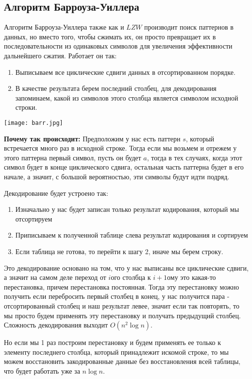 \documentclass{article}
\begin{document}
\subsection{Алгоритм Барроуза-Уиллера}
Алгоритм Барроуза-Уиллера также как и $LZW$ производит поиск паттернов в данных, но вместо того, чтобы сжимать их, он просто превращает их в последовательности из одинаковых символов для увеличения эффективности дальнейшего сжатия. Работает он так:
\begin{enumerate}
    \item Выписываем все циклические сдвиги данных в отсортированном порядке.
    \item В качестве результата берем последний столбец, для декодирования запоминаем, какой из символов этого столбца является символом исходной строки.
\end{enumerate} 
\begin{center}
  \texttt{[image: barr.jpg]}
\end{center}
\textbf{Почему так происходит:} Предположим у нас есть паттерн $s$, который встречается много раз в исходной строке. Тогда если мы возьмем и отрежем у этого паттерна первый символ, пусть он будет $a$, тогда в тех случаях, когда этот символ будет в конце циклического сдвига, остальная часть паттерна будет в его начале, а значит, с большой вероятностью, эти символы будут идти подряд.

Декодирование будет устроено так:
\begin{enumerate}
    \item Изначально у нас будет записан только результат кодирования, который мы отсортируем
    \item Приписываем к полученной таблице слева результат кодирования и сортируем
    \item Если таблица не готова, то перейти к шагу 2, иначе мы берем строку.
\end{enumerate}
Это декодирование основано на том, что у нас выписаны все циклические сдвиги, а значит на самом деле переход от $i$ого столбца к $i+1$ому это какая-то перестановка, причем перестановка постоянная. Тогда эту перестановку можно получить если перебросить первый столбец в конец, у нас получится пара - отсортированный столбец и наш результат левее, значит если так повторять, то мы просто будем применять эту перестановку и получать предыдущий столбец. Сложность декодирования выходит $O(n^2\log n)$.

Но если мы 1 раз построим перестановку и будем применять ее только к элементу последнего столбца, который принадлежит искомой строке, то мы можем восстановить закодированные данные без восстановления всей таблицы, что будет работать уже за $n\log n$.
\end{document}
